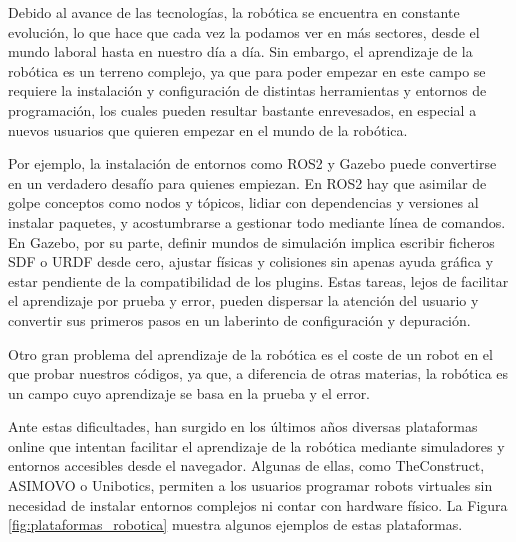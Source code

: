 \documentclass[a4paper, 12pt]{book}
\begin{document}
Debido al avance de las tecnologías, la robótica se encuentra en constante evolución, lo que hace que cada vez la podamos ver en más sectores, desde el mundo laboral hasta en nuestro día a día. Sin embargo, el aprendizaje de la robótica es un terreno complejo, ya que para poder empezar en este campo se requiere la instalación y configuración de distintas herramientas y entornos de programación, los cuales pueden resultar bastante enrevesados, en especial a nuevos usuarios que quieren empezar en el mundo de la robótica.

Por ejemplo, la instalación de entornos como ROS2 y Gazebo \cite{rico2025concise} puede convertirse en un verdadero desafío para quienes empiezan. En ROS2 hay que asimilar de golpe conceptos como nodos y tópicos, lidiar con dependencias y versiones al instalar paquetes, y acostumbrarse a gestionar todo mediante línea de comandos. En Gazebo, por su parte, definir mundos de simulación implica escribir ficheros SDF o URDF desde cero, ajustar físicas y colisiones sin apenas ayuda gráfica y estar pendiente de la compatibilidad de los plugins. Estas tareas, lejos de facilitar el aprendizaje por prueba y error, pueden dispersar la atención del usuario y convertir sus primeros pasos en un laberinto de configuración y depuración.

Otro gran problema del aprendizaje de la robótica es el coste de un robot en el que probar nuestros códigos, ya que, a diferencia de otras materias, la robótica es un campo cuyo aprendizaje se basa en la prueba y el error.

Ante estas dificultades, han surgido en los últimos años diversas plataformas online que intentan facilitar el aprendizaje de la robótica mediante simuladores y entornos accesibles desde el navegador. Algunas de ellas, como TheConstruct, ASIMOVO o Unibotics, permiten a los usuarios programar robots virtuales sin necesidad de instalar entornos complejos ni contar con hardware físico. La Figura \ref{fig:plataformas_robotica} muestra algunos ejemplos de estas plataformas.
\end{document}
